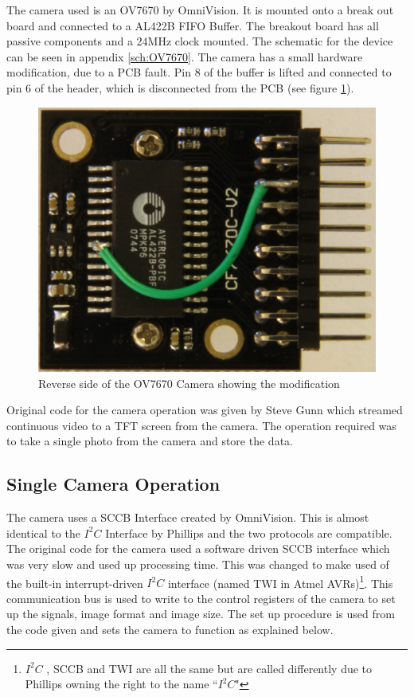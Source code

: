 The camera used is an OV7670 by OmniVision. It is mounted onto a break out board and connected to a AL422B FIFO Buffer. The breakout board has all passive components and a 24MHz clock mounted. The schematic for the device can be seen in appendix \ref{sch:OV7670}. The camera has a small hardware modification, due to a PCB fault. Pin 8 of the buffer is lifted and connected to pin 6 of the header, which is disconnected from the PCB (see figure \ref{fig:OV7670:Mod}).
\begin{figure}
\centering
\includegraphics[width=\textwidth /4]{Figures/OV7670_Back.jpg}
\caption{Reverse side of the OV7670 Camera showing the modification}
\label{fig:OV7670:Mod}
\end{figure}
Original code for the camera operation was given by Steve Gunn which streamed continuous video to a TFT screen from the camera. The operation required was to take a single photo from the camera and store the data. 

\subsection{Single Camera Operation}

The camera uses a SCCB Interface \citep{SCCB_Interface} created by OmniVision. This is almost identical to the $I^{2}C$ Interface by Phillips and the two protocols are compatible. The original code for the camera used a software driven SCCB interface which was very slow and used up processing time. This was changed to make used of the built-in interrupt-driven $I^{2}C$ interface (named TWI in Atmel AVRs)\footnote{$I^{2}C$ , SCCB and TWI are all the same but are called differently due to Phillips owning the right to the name ``$I^{2}C$"}. This communication bus is used to write to the control registers of the camera to set up the signals, image format and image size. The set up procedure is used from the code given and sets the camera to function as explained below.

